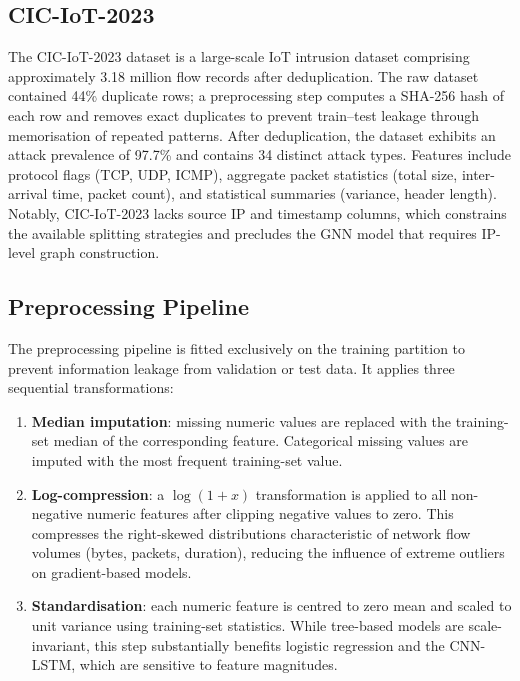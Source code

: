\documentclass[12pt,a4paper]{report}
\begin{document}
\subsection{CIC-IoT-2023}
\label{sec:ciciot-meth}

The CIC-IoT-2023 dataset \citep{cic2023} is a large-scale IoT intrusion dataset comprising approximately 3.18 million flow records after deduplication. The raw dataset contained 44\% duplicate rows; a preprocessing step computes a SHA-256 hash of each row and removes exact duplicates to prevent train--test leakage through memorisation of repeated patterns. After deduplication, the dataset exhibits an attack prevalence of 97.7\% and contains 34 distinct attack types. Features include protocol flags (TCP, UDP, ICMP), aggregate packet statistics (total size, inter-arrival time, packet count), and statistical summaries (variance, header length). Notably, CIC-IoT-2023 lacks source IP and timestamp columns, which constrains the available splitting strategies and precludes the GNN model that requires IP-level graph construction.

\subsection{Preprocessing Pipeline}
\label{sec:preprocess}

The preprocessing pipeline is fitted exclusively on the training partition to prevent information leakage from validation or test data. It applies three sequential transformations:

\begin{enumerate}
  \item \textbf{Median imputation}: missing numeric values are replaced with the training-set median of the corresponding feature. Categorical missing values are imputed with the most frequent training-set value.
  \item \textbf{Log-compression}: a $\log(1 + x)$ transformation is applied to all non-negative numeric features after clipping negative values to zero. This compresses the right-skewed distributions characteristic of network flow volumes (bytes, packets, duration), reducing the influence of extreme outliers on gradient-based models.
  \item \textbf{Standardisation}: each numeric feature is centred to zero mean and scaled to unit variance using training-set statistics. While tree-based models are scale-invariant, this step substantially benefits logistic regression and the CNN-LSTM, which are sensitive to feature magnitudes.
\end{enumerate}
\end{document}

